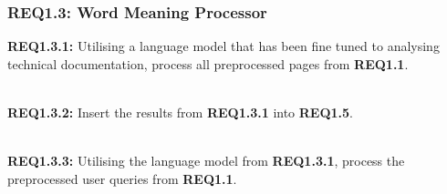 \subsubsection{REQ1.3: Word Meaning Processor}

\textbf{REQ1.3.1:} Utilising a language model that has been fine tuned to analysing technical documentation, process all preprocessed pages from \textbf{REQ1.1}.\par

\textbf{\\REQ1.3.2:} Insert the results from \textbf{REQ1.3.1} into \textbf{REQ1.5}.\par

\textbf{\\REQ1.3.3:} Utilising the language model from \textbf{REQ1.3.1}, process the preprocessed user queries from \textbf{REQ1.1}.\par
